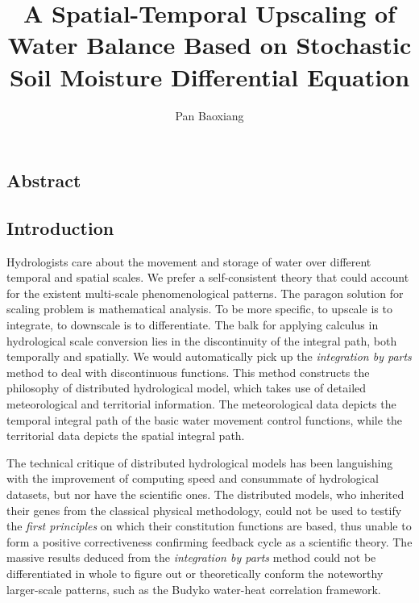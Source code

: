 \documentclass[11pt]{article}
\begin{document}
\title{A Spatial-Temporal Upscaling of Water Balance Based on Stochastic Soil Moisture Differential Equation}
\date{ }
\author{Pan Baoxiang}
\maketitle
\begin{center}
\newpage
\section*{Abstract}
\newpage
\tableofcontents
\end{center}
\newpage
\begin{center}
\section{Introduction}
\end{center}

Hydrologists care about the movement and storage of water over different temporal and spatial scales. We prefer a self-consistent theory that could account for the existent multi-scale phenomenological patterns. The paragon solution for scaling problem is mathematical analysis. To be more specific, to upscale is to integrate, to downscale is to differentiate. The balk for applying calculus in hydrological scale conversion lies in the discontinuity of the integral path, both temporally and spatially. We would automatically pick up the \textit{integration by parts} method to deal with discontinuous functions. This method constructs the philosophy of distributed hydrological model, which takes use of detailed meteorological and territorial information. The meteorological data depicts the temporal integral path of the basic water movement control functions, while the territorial data depicts the spatial integral path.  

The technical critique of distributed hydrological models has been languishing with the improvement of computing speed and 
consummate of hydrological datasets, but nor have the scientific ones. The distributed models, who inherited their genes from the classical physical methodology, could not be used to testify the \textit{first principles} on which their constitution functions are based, thus unable to form a positive correctiveness confirming feedback cycle as a scientific theory. The massive results deduced from the \textit{integration by parts} method could not be differentiated in whole to figure out or theoretically conform the noteworthy larger-scale patterns, such as the Budyko water-heat correlation framework.    
\end{document}
